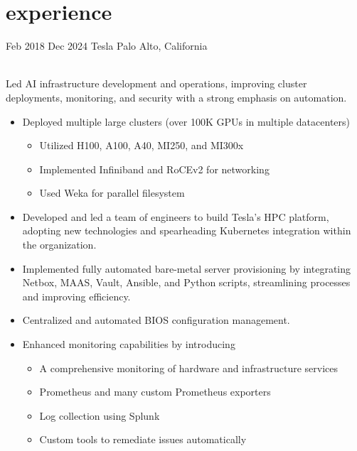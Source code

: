 \documentclass[]{cv-style}          %
\begin{document}

\section{experience}


\begin{entrylist}
\entry
{Feb 2018 \newline
Dec 2024}
{Tesla}
{Palo Alto, California}
{ \\
Led AI infrastructure development and operations, improving cluster deployments, monitoring, and security with a strong emphasis on automation.
\begin{itemize}
\item Deployed multiple large clusters (over 100K GPUs in multiple datacenters)
\begin{itemize}
    \item Utilized H100, A100, A40, MI250, and MI300x
    \item Implemented Infiniband and RoCEv2 for networking
    \item Used Weka for parallel filesystem
\end{itemize}
\item Developed and led a team of engineers to build Tesla’s HPC platform, adopting new technologies and spearheading Kubernetes integration within the organization.
\item Implemented fully automated bare-metal server provisioning by integrating Netbox, MAAS, Vault, Ansible, and Python scripts, streamlining processes and improving efficiency.
\item Centralized and automated BIOS configuration management.
\item Enhanced monitoring capabilities by introducing
\begin{itemize}
    \item A comprehensive monitoring of hardware and infrastructure services
    \item Prometheus and many custom Prometheus exporters
    \item Log collection using Splunk
    \item Custom tools to remediate issues automatically
\end{itemize}

\end{itemize}}
\end{entrylist}
\end{document}

